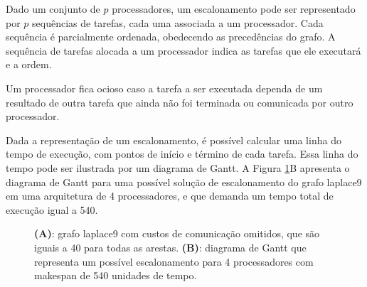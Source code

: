 \documentclass[fleqn,10pt]{SelfArx} %
\begin{document}
Dado um conjunto de \(p\) processadores, um escalonamento pode ser representado por \(p\) sequências de tarefas, cada uma associada a um processador. Cada sequência é parcialmente ordenada, obedecendo as precedências do grafo. A sequência de tarefas alocada a um processador indica as tarefas que ele executará e a ordem.

Um processador fica ocioso caso a tarefa a ser executada dependa de um resultado de outra tarefa que ainda não foi terminada ou comunicada por outro processador.

Dada a representação de um escalonamento, é possível calcular uma linha do tempo de execução, com pontos de início e término de cada tarefa. Essa linha do tempo pode ser ilustrada por um diagrama de Gantt. A Figura \ref{fig:laplgantt}B apresenta o diagrama de Gantt para uma possível solução de escalonamento do grafo laplace9 em uma arquitetura de 4 processadores, e que demanda um tempo total de execução igual a 540.


\begin{figure}[]
  \centering
  \caption{ \textbf{(A)}: grafo laplace9 com custos de comunicação omitidos, que são iguais a 40 para todas as arestas. \textbf{(B)}: diagrama de Gantt que representa um possível escalonamento para 4 processadores com makespan de 540 unidades de tempo. }
   \label{fig:laplgantt}
\end{figure}
\end{document}
